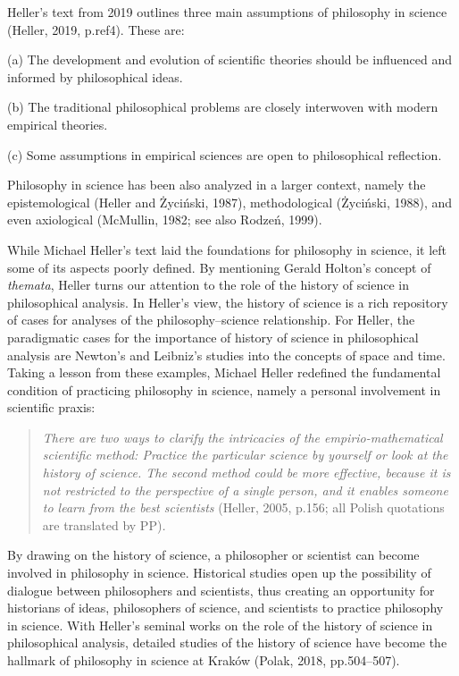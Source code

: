 \documentclass[a4paper]{article}
\begin{document}
Heller’s text from 2019 outlines three main assumptions of philosophy in science (Heller, 2019, p.ref4). These are:

(a) The development and evolution of scientific theories should be influenced and informed by philosophical ideas.

(b) The traditional philosophical problems are closely interwoven with modern empirical theories.

(c) Some assumptions in empirical sciences are open to philosophical reflection.

Philosophy in science has been also analyzed in a larger context, namely the epistemological (Heller and Życiński,
1987), methodological (Życiński, 1988), and even axiological (McMullin, 1982; see also Rodzeń, 1999). 

While Michael Heller’s text laid the foundations for philosophy in science, it left some of its aspects poorly defined.
By mentioning Gerald Holton’s concept of \textit{themata}, Heller turns our attention to the role of the history of
science in philosophical analysis. In Heller’s view, the history of science is a rich repository of cases for analyses
of the philosophy–science relationship. For Heller, the paradigmatic cases for the importance of history of science in
philosophical analysis are Newton’s and Leibniz’s studies into the concepts of space and time. Taking a lesson from
these examples, Michael Heller redefined the fundamental condition of practicing philosophy in science, namely a
personal involvement in scientific praxis:

\begin{quotation}
\textit{There are two ways to clarify the intricacies of the empirio-mathematical scientific method: Practice the
particular science by yourself or look at the history of science. The second method could be more effective, because it
is not restricted to the perspective of a single person, and it enables someone to learn from the best scientists
}(Heller, 2005, p.156; all Polish quotations are translated by PP)\textit{.}

\end{quotation}
By drawing on the history of science, a philosopher or scientist can become involved in philosophy in science.
Historical studies open up the possibility of dialogue between philosophers and scientists, thus creating an
opportunity for historians of ideas, philosophers of science, and scientists to practice philosophy in science. With
Heller’s seminal works on the role of the history of science in philosophical analysis, detailed studies of the history
of science have become the hallmark of philosophy in science at Kraków (Polak, 2018, pp.504–507).
\end{document}
